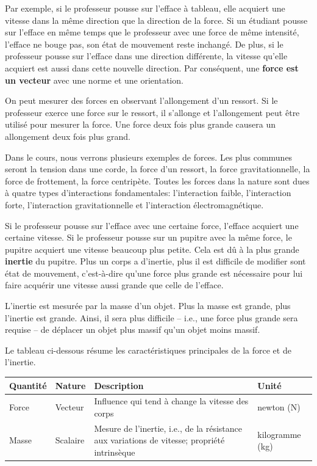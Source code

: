 Par exemple, si le professeur pousse sur l'efface à tableau, elle acquiert une
vitesse dans la même direction que la direction de la force.  Si un étudiant
pousse sur l'efface en même temps que le professeur avec une force de même
intensité, l'efface ne bouge pas, son état de mouvement reste inchangé.  De
plus, si le professeur pousse sur l'efface dans une direction différente, la
vitesse qu'elle acquiert est aussi dans cette nouvelle direction.  Par
conséquent, une \textbf{force est un vecteur} avec une norme et une
orientation.

On peut mesurer des forces en observant l'allongement d'un ressort.  Si le
professeur exerce une force sur le ressort, il s'allonge et l'allongement peut
être utilisé pour mesurer la force.  Une force deux fois plus grande causera un
allongement deux fois plus grand.

Dans le cours, nous verrons plusieurs exemples de forces.  Les plus communes
seront la tension dans une corde, la force d'un ressort, la force
gravitationnelle, la force de frottement, la force centripète.  Toutes les
forces dans la nature sont dues à quatre types d'interactions fondamentales:
l'interaction faible, l'interaction forte, l'interaction gravitationnelle et
l'interaction électromagnétique.

Si le professeur pousse sur l'efface avec une certaine force, l'efface acquiert
une certaine vitesse.  Si le professeur pousse sur un pupitre avec la même
force, le pupitre acquiert une vitesse beaucoup plus petite.  Cela est dû à la
plus grande \textbf{inertie} du pupitre.  Plus un corps a d'inertie, plus il
est difficile de modifier sont état de mouvement, c'est-à-dire qu'une force
plus grande est nécessaire pour lui faire acquérir une vitesse aussi grande que
celle de l'efface.

L'inertie est mesurée par la masse d'un objet.  Plus la masse est grande, plus
l'inertie est grande.  Ainsi, il sera plus difficile -- i.e., une force plus
grande sera requise -- de déplacer un objet plus massif qu'un objet moins
massif.

Le tableau ci-dessous résume les caractéristiques principales de la force et de
l'inertie.

\vspace{0.3cm}
\begin{fullwidth}
    \begin{tabular}{llp{8cm}l}
      \toprule
      Quantité  &  Nature   &  Description  &  Unité  \\
      \midrule
      Force     &  Vecteur  &  Influence qui tend à change la vitesse des corps  &
      newton (\si{\newton}) \\
      Masse     &  Scalaire &  Mesure de l'inertie, i.e., de la résistance aux
      variations de vitesse; propriété intrinsèque  &  kilogramme (\si{\kilo\gram}) \\
      \bottomrule
    \end{tabular}
\end{fullwidth}
\vspace{0.3cm}

